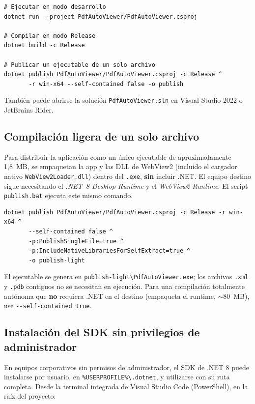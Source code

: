 \documentclass[11pt,a4paper]{article}
\newcommand{\bs}{\textbackslash\allowbreak}
\newcommand{\ruta}[1]{\texttt{\small #1}}
\begin{document}
\begin{lstlisting}[caption={Compilación y ejecución.}]
# Ejecutar en modo desarrollo
dotnet run --project PdfAutoViewer/PdfAutoViewer.csproj

# Compilar en modo Release
dotnet build -c Release

# Publicar un ejecutable de un solo archivo
dotnet publish PdfAutoViewer/PdfAutoViewer.csproj -c Release ^
       -r win-x64 --self-contained false -o publish
\end{lstlisting}

También puede abrirse la solución \texttt{PdfAutoViewer.sln} en Visual Studio
2022 o JetBrains Rider.

\subsection{Compilación ligera de un solo archivo}
Para distribuir la aplicación como un único ejecutable de aproximadamente
1,8~MB, se empaquetan la app y las DLL de WebView2 (incluido el cargador nativo
\texttt{WebView2Loader.dll}) dentro del \texttt{.exe}, \textbf{sin} incluir .NET.
El equipo destino sigue necesitando el \emph{.NET~8 Desktop Runtime} y el
\emph{WebView2 Runtime}. El script \texttt{publish.bat} ejecuta este mismo
comando.

\begin{lstlisting}[caption={Compilación ligera (un solo archivo, sin .NET embebido).}]
dotnet publish PdfAutoViewer/PdfAutoViewer.csproj -c Release -r win-x64 ^
       --self-contained false ^
       -p:PublishSingleFile=true ^
       -p:IncludeNativeLibrariesForSelfExtract=true ^
       -o publish-light
\end{lstlisting}

El ejecutable se genera en \ruta{publish-light\bs PdfAutoViewer.exe}; los archivos
\texttt{.xml} y \texttt{.pdb} contiguos no se necesitan en ejecución. Para una
compilación totalmente autónoma que \textbf{no} requiera .NET en el destino
(empaqueta el runtime, $\sim$80~MB), use \texttt{-{}-self-contained true}.

\subsection{Instalación del SDK sin privilegios de administrador}
En equipos corporativos sin permisos de administrador, el SDK de .NET 8 puede
instalarse por usuario, en \ruta{\%USERPROFILE\%\bs.dotnet}, y utilizarse con su
ruta completa. Desde la terminal integrada de Visual Studio Code (PowerShell), en
la raíz del proyecto:
\end{document}
